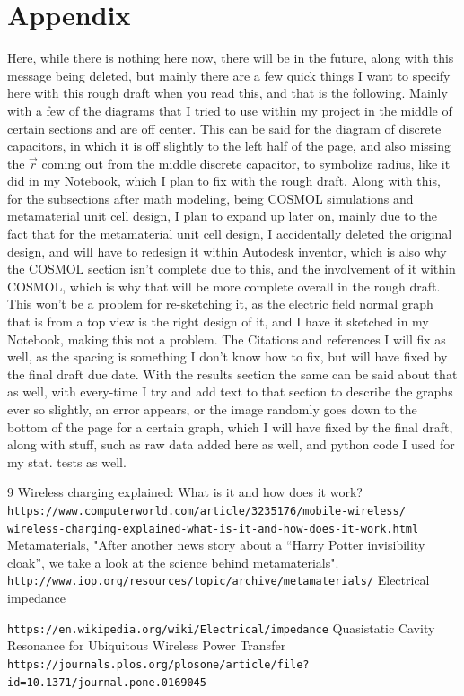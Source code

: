 \documentclass[]{article}
\begin{document}
\section{Appendix}
Here, while there is nothing here now, there will be in the future, along with this message being deleted, but mainly there are a few quick things I want to specify here with this rough draft when you read this, and that is the following. Mainly with a few of the diagrams that I tried to use within my project in the middle of certain sections and are off center. This can be said for the diagram of discrete capacitors, in which it is off slightly to the left half of the page, and also missing the $\vec{r}$ coming out from the middle discrete capacitor, to symbolize radius, like it did in my Notebook, which I plan to fix with the rough draft. Along with this, for the subsections after math modeling, being COSMOL simulations and metamaterial unit cell design, I plan to expand up later on, mainly due to the fact that for the metamaterial unit cell design, I accidentally deleted the original design, and will have to redesign it within Autodesk inventor, which is also why the COSMOL section isn't complete due to this, and the involvement of it within COSMOL, which is why that will be more complete overall in the rough draft. This won't be a problem for re-sketching it, as the electric field normal graph that is from a top view is the right design of it, and I have it sketched in my Notebook, making this not a problem. The Citations and references I will fix as well, as the spacing is something I don't know how to fix, but will have fixed by the final draft due date. With the results section the same can be said about that as well, with every-time I try and add text to that section to describe the graphs ever so slightly, an error appears, or the image randomly goes down to the bottom of the page for a certain graph, which I will have fixed by the final draft, along with stuff, such as raw data added here as well, and python code I used for my stat. tests as well.
\begin{thebibliography} {9}
Wireless charging explained: What is it and how does it work?
\texttt{https://www.computerworld.com/article/3235176/mobile-wireless/
	wireless-charging-explained-what-is-it-and-how-does-it-work.html}
Metamaterials, "After another news story about a “Harry Potter invisibility cloak”, we take a look at the science behind metamaterials".
\texttt{http://www.iop.org/resources/topic/archive/metamaterials/}
Electrical impedance

\texttt{https://en.wikipedia.org/wiki/Electrical/impedance}	
Quasistatic Cavity Resonance for Ubiquitous Wireless Power Transfer
\texttt{https://journals.plos.org/plosone/article/file?id=10.1371/journal.pone.0169045}
\end{thebibliography}
\end{document}
